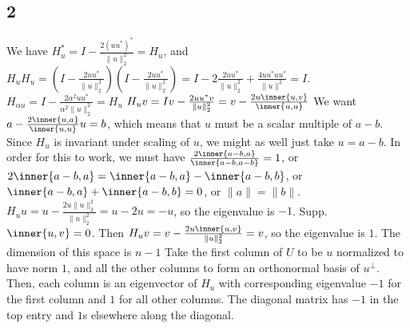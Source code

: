\documentclass{article}
\begin{document}
\subsection*{2}
We have $H_u^*=I-\frac{2(uu^*)^*}{\|u\|_2^2}=H_u$, and $H_uH_u=(I-\frac{2uu^*}{\|u\|_2^2})(I-\frac{2uu^*}{\|u\|_2^2})=I-2\frac{2uu^*}{\|u\|_2^2}+\frac{4uu^*uu^*}{\|u\|^2}=I$.
$H_{\alpha u}=I-\frac{2\alpha^2uu^*}{\alpha^2\|u\|_2^2}=H_u$
$H_uv=Iv-\frac{2uu^*v}{\|u\|_2^2}=v-\frac{2u\inner{u,v}}{\inner{u,u}}$ 
We want $a-\frac{2\inner{u,a}}{\inner{u,u}}u=b$, which means that $u$ must be a scalar multiple of $a-b$. Since $H_u$ is invariant under scaling of $u$, we might as well just take $u=a-b$. In order for this to work, we must have $\frac{2\inner{a-b,a}}{\inner{a-b,a-b}}=1$, or $2\inner{a-b,a}=\inner{a-b,a}-\inner{a-b,b}$, or $\inner{a-b,a}+\inner{a-b,b}=0$, or $\|a\|=\|b\|$. 
$H_uu=u-\frac{2u\|u\|_2^2}{\|u\|_2^2}=u-2u=-u$, so the eigenvalue is $-1$.
Supp. $\inner{u,v}=0$. Then $H_uv=v-\frac{2u\inner{u,v}}{\|u\|_2^2}=v$, so the eigenvalue is $1$. The dimension of this space is $n-1$
Take the first column of $U$ to be $u$ normalized to have norm $1$, and all the other columns to form an orthonormal basis of $u^\perp$. Then, each column is an eigenvector of $H_u$ with corresponding eigenvalue $-1$ for the first column and $1$ for all other columns. The diagonal matrix has $-1$ in the top entry and $1$s elsewhere along the diagonal.
\end{document}
